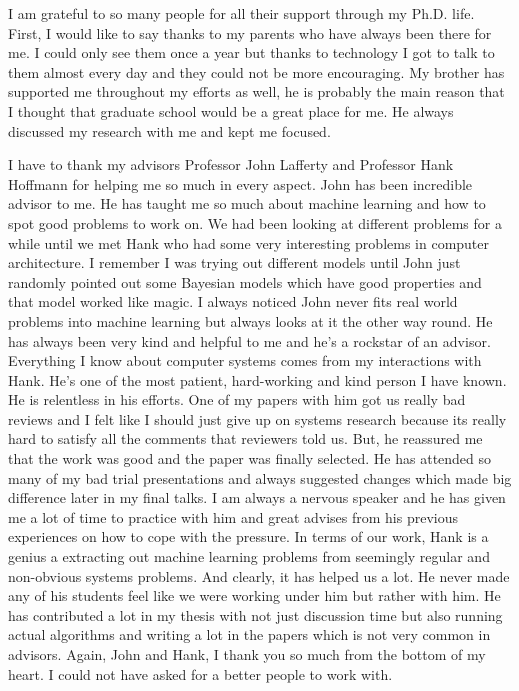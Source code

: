 I am grateful to so many people for all their support through my Ph.D. life. First,
I would like to say thanks to my parents who have always been there for me. I could
only see them once a year but thanks to technology I got to talk to them almost every day
and they could not be more encouraging. My brother has supported me throughout
my efforts as well, he is probably the main reason that I thought that graduate
school would be a great place for me. He always discussed my research with me and
kept me focused.

I have to thank my advisors Professor John Lafferty and Professor Hank Hoffmann for helping me so much in every aspect. 
John has been incredible advisor to me. He has taught me so much about machine 
learning and how to spot good problems to work on. We had been looking at different 
problems for a while until we met Hank who had some very interesting problems in 
computer architecture. I remember I was trying out different models until John just randomly 
pointed out some Bayesian models which have good properties and that model worked like magic.
I always noticed John never fits real world problems into machine learning 
but always looks at it the other way round. He has always been very kind and helpful to 
me and he's a rockstar of an advisor. Everything I know about computer systems comes from 
my interactions with Hank.
He's one of the most patient, hard-working and kind person I have known. He is
relentless in his efforts. One of my papers with him got us really bad reviews and 
I felt like I should just give up on systems research because its really hard to 
satisfy all the comments that reviewers told us. But, he reassured me that the work was good and 
the paper was finally selected. He has attended so many of my bad trial presentations
and always suggested changes which made big difference later in my final talks.
I am always a nervous speaker and he has given me a lot of time to practice with him 
and great advises from his previous experiences on how to cope with the pressure.
In terms of our work, Hank is a genius a extracting out machine learning problems
from seemingly regular and non-obvious systems problems. And clearly, it has helped us a lot.
He never made any of his students feel like we were working under him but rather with him.
He has contributed a lot in my thesis with not just discussion time but also running actual 
algorithms and writing a lot in the papers which is not very common in advisors. Again, John and Hank,
I thank you so much from the bottom of my heart. I could not have asked for a better people 
to work with. 

